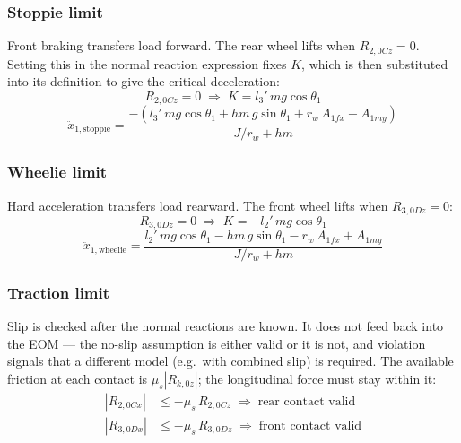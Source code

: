 \documentclass[10pt]{extarticle}
\numberwithin{equation}{subsubsection}
\begin{document}
\subsubsection{Stoppie limit}

Front braking transfers load forward. The rear wheel lifts when $R_{2,0Cz} = 0$. Setting this in the normal reaction expression fixes $K$, which is then substituted into its definition to give the critical deceleration:
\begin{equation}
    R_{2,0Cz} = 0 \;\Rightarrow\; K = l_3'\,mg\cos\theta_1
\end{equation}
\begin{equation}
    \ddot{x}_{1,\text{stoppie}} = \frac{-\left(l_3'\,mg\cos\theta_1 + hm\,g\sin\theta_1 + r_w\,A_{1fx} - A_{1my}\right)}{J/r_w + hm}
\end{equation}

\subsubsection{Wheelie limit}

Hard acceleration transfers load rearward. The front wheel lifts when $R_{3,0Dz} = 0$:
\begin{equation}
    R_{3,0Dz} = 0 \;\Rightarrow\; K = -l_2'\,mg\cos\theta_1
\end{equation}
\begin{equation}
    \ddot{x}_{1,\text{wheelie}} = \frac{l_2'\,mg\cos\theta_1 - hm\,g\sin\theta_1 - r_w\,A_{1fx} + A_{1my}}{J/r_w + hm}
\end{equation}

\subsubsection{Traction limit}

Slip is checked after the normal reactions are known. It does not feed back into the EOM — the no-slip assumption is either valid or it is not, and violation signals that a different model (e.g.\ with combined slip) is required. The available friction at each contact is $\mu_s |R_{k,0z}|$; the longitudinal force must stay within it:
\begin{align}
    \left|R_{2,0Cx}\right| &\le -\mu_s\,R_{2,0Cz} \;\Rightarrow\; \text{rear contact valid} \\
    \left|R_{3,0Dx}\right| &\le -\mu_s\,R_{3,0Dz} \;\Rightarrow\; \text{front contact valid}
\end{align}
\end{document}
